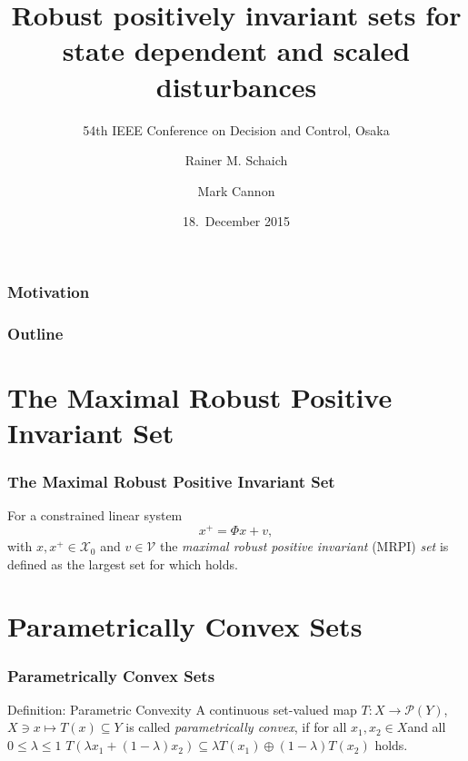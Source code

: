 \documentclass{beamer}
\title{Robust positively invariant sets for state dependent and scaled disturbances}
\subtitle{54th IEEE Conference on Decision and Control, Osaka}
\author{Rainer M. Schaich \and Mark Cannon}
\date{18.~December 2015}
\theoremstyle{plain}
\begin{document}
	{
		\begin{frame}
			\titlepage
		\end{frame}
	}


\begin{frame}
\frametitle{Motivation}
\end{frame}

\begin{frame}
\frametitle{Outline}
\tableofcontents
\end{frame}

\section{The Maximal Robust Positive Invariant Set}
\begin{frame}
\frametitle{The Maximal Robust Positive Invariant Set}
For a constrained linear system
\[
x^+ = \Phi x + v,
\]
with $x,x^+\in\mathcal X_0$ and $v\in\mathscr V$ the \emph{maximal robust positive invariant} 
(MRPI) \emph{set} is defined as the largest set for which
holds.
\end{frame}

\section{Parametrically Convex Sets}
\begin{frame}
\frametitle{Parametrically Convex Sets}
\begin{block}{Definition: Parametric Convexity}
A continuous set-valued map $T: X\rightarrow\mathcal P(Y)$, $X\ni x\mapsto T(x)\subseteq Y$ is called \emph{parametrically convex}, if for all $x_1,x_2\in X$and all $0\leq\lambda\leq1$ $T(\lambda x_1 + (1-\lambda)x_2)\subseteq \lambda T(x_1) \oplus (1-\lambda)T(x_2)$ holds.
\end{block}


\end{frame}
\end{document}
